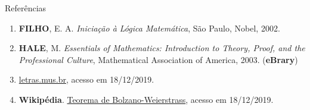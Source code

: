\begin{frame}[fragile]{Referências}

    \begin{enumerate}
        \item \textbf{FILHO}, E. A.  \textit{Iniciação à Lógica Matemática}, São Paulo, Nobel, 2002. 
        \item \textbf{HALE}, M. \textit{Essentials of Mathematics: Introduction to Theory, Proof, and the Professional Culture}, Mathematical Association of America, 2003. (\textbf{eBrary})

        \item \href{https://www.letras.mus.br/}{letras.mus.br}, acesso em 18/12/2019.

        \item \textbf{Wikipédia}. \href{https://pt.wikipedia.org/wiki/Teorema_de_Bolzano-Weierstrass}{Teorema de Bolzano-Weierstrass}, acesso em 18/12/2019.
 
    \end{enumerate}

\end{frame}
